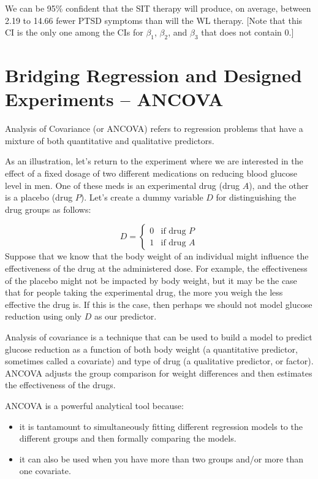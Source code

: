 \documentclass[
]{book}
\providecommand{\tightlist}{%
  \setlength{\itemsep}{0pt}\setlength{\parskip}{0pt}}
\begin{document}
We can be 95\% confident that the SIT therapy will produce, on average, between 2.19 to 14.66 fewer PTSD symptoms than will the WL therapy. {[}Note that this CI is the only one among the CIs for \(\beta_1\), \(\beta_2\), and \(\beta_3\) that does not contain 0.{]}

\hypertarget{bridging-regression-and-designed-experiments-ancova}{%
\section{Bridging Regression and Designed Experiments -- ANCOVA}\label{bridging-regression-and-designed-experiments-ancova}}

Analysis of Covariance (or ANCOVA) refers to regression problems that have a mixture of both quantitative and qualitative predictors.

As an illustration, let's return to the experiment where we are interested in the effect of a fixed dosage of two different medications on reducing blood glucose level in men. One of these meds is an experimental drug (drug \(A\)), and the other is a placebo (drug \(P\)). Let's create a dummy variable \(D\) for distinguishing the drug groups as follows:

\[D = \left\{\begin{array}{ll} 0 & \textrm{if drug } P \\ 1 & \textrm{if drug } A \end{array}\right.\]
Suppose that we know that the body weight of an individual might influence the effectiveness of the drug at the administered dose. For example, the effectiveness of the placebo might not be impacted by body weight, but it may be the case that for people taking the experimental drug, the more you weigh the less effective the drug is. If this is the case, then perhaps we should not model glucose reduction using only \(D\) as our predictor.

Analysis of covariance is a technique that can be used to build a model to predict glucose reduction as a function of both body weight (a quantitative predictor, sometimes called a covariate) and type of drug (a qualitative predictor, or factor). ANCOVA adjusts the group comparison for weight differences and then estimates the effectiveness of the drugs.

ANCOVA is a powerful analytical tool because:

\begin{itemize}
\tightlist
\item
  it is tantamount to simultaneously fitting different regression models to the different groups and then formally comparing the models.
\item
  it can also be used when you have more than two groups and/or more than one covariate.
\end{itemize}
\end{document}
